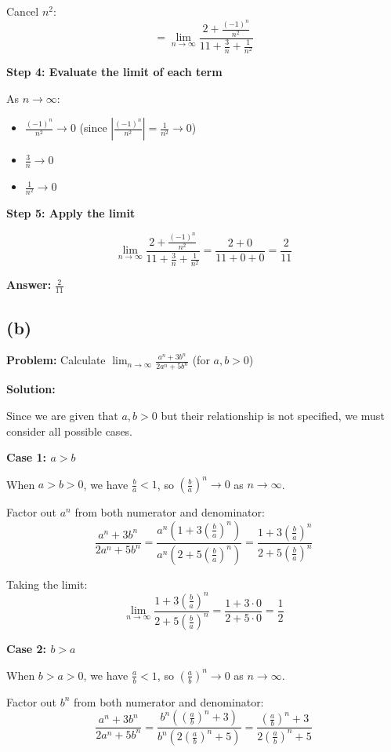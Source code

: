 \documentclass[12pt,a4paper]{article}
\theoremstyle{definition}
\theoremstyle{remark}
\begin{document}
Cancel $n^2$:
$$= \lim_{n \to \infty} \frac{2 + \frac{(-1)^n}{n^2}}{11 + \frac{3}{n} + \frac{1}{n^2}}$$

\textbf{Step 4: Evaluate the limit of each term}

As $n \to \infty$:
\begin{itemize}
\item $\frac{(-1)^n}{n^2} \to 0$ (since $\left|\frac{(-1)^n}{n^2}\right| = \frac{1}{n^2} \to 0$)
\item $\frac{3}{n} \to 0$
\item $\frac{1}{n^2} \to 0$
\end{itemize}

\textbf{Step 5: Apply the limit}

$$\lim_{n \to \infty} \frac{2 + \frac{(-1)^n}{n^2}}{11 + \frac{3}{n} + \frac{1}{n^2}} = \frac{2 + 0}{11 + 0 + 0} = \frac{2}{11}$$

\textbf{Answer:} $\boxed{\frac{2}{11}}$


\subsection*{(b)}
\textbf{Problem:} Calculate $\lim_{n \to \infty} \frac{a^n + 3b^n}{2a^n + 5b^n}$ (for $a, b > 0$)

\textbf{Solution:}

Since we are given that $a, b > 0$ but their relationship is not specified, we must consider all possible cases.

\textbf{Case 1: $a > b$}

When $a > b > 0$, we have $\frac{b}{a} < 1$, so $\left(\frac{b}{a}\right)^n \to 0$ as $n \to \infty$.

Factor out $a^n$ from both numerator and denominator:
$$\frac{a^n + 3b^n}{2a^n + 5b^n} = \frac{a^n\left(1 + 3\left(\frac{b}{a}\right)^n\right)}{a^n\left(2 + 5\left(\frac{b}{a}\right)^n\right)} = \frac{1 + 3\left(\frac{b}{a}\right)^n}{2 + 5\left(\frac{b}{a}\right)^n}$$

Taking the limit:
$$\lim_{n \to \infty} \frac{1 + 3\left(\frac{b}{a}\right)^n}{2 + 5\left(\frac{b}{a}\right)^n} = \frac{1 + 3 \cdot 0}{2 + 5 \cdot 0} = \frac{1}{2}$$

\textbf{Case 2: $b > a$}

When $b > a > 0$, we have $\frac{a}{b} < 1$, so $\left(\frac{a}{b}\right)^n \to 0$ as $n \to \infty$.

Factor out $b^n$ from both numerator and denominator:
$$\frac{a^n + 3b^n}{2a^n + 5b^n} = \frac{b^n\left(\left(\frac{a}{b}\right)^n + 3\right)}{b^n\left(2\left(\frac{a}{b}\right)^n + 5\right)} = \frac{\left(\frac{a}{b}\right)^n + 3}{2\left(\frac{a}{b}\right)^n + 5}$$
\end{document}
